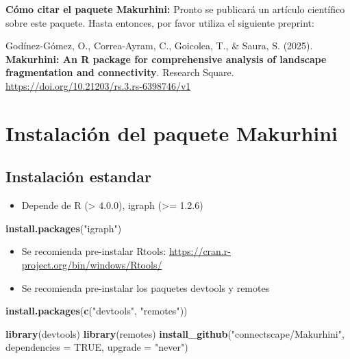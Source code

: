 \documentclass[
]{book}
\newenvironment{Shaded}{\begin{snugshade}}{\end{snugshade}}
\newcommand{\AttributeTok}[1]{\textcolor[rgb]{0.13,0.29,0.53}{#1}}
\newcommand{\ConstantTok}[1]{\textcolor[rgb]{0.56,0.35,0.01}{#1}}
\newcommand{\FunctionTok}[1]{\textcolor[rgb]{0.13,0.29,0.53}{\textbf{#1}}}
\newcommand{\NormalTok}[1]{#1}
\newcommand{\StringTok}[1]{\textcolor[rgb]{0.31,0.60,0.02}{#1}}
\providecommand{\tightlist}{%
  \setlength{\itemsep}{0pt}\setlength{\parskip}{0pt}}
\begin{document}
\textbf{Cómo citar el paquete Makurhini:} Pronto se publicará un artículo científico sobre este paquete. Hasta entonces, por favor utiliza el siguiente preprint:

Godínez-Gómez, O., Correa-Ayram, C., Goicolea, T., \& Saura, S. (2025). \textbf{Makurhini: An R package for comprehensive analysis of landscape fragmentation and connectivity}. Research Square. \url{https://doi.org/10.21203/rs.3.rs-6398746/v1}

\chapter{Instalación del paquete Makurhini}\label{instalaciuxf3n-del-paquete-makurhini}

\section{Instalación estandar}\label{instalaciuxf3n-estandar}

\begin{itemize}
\tightlist
\item
  Depende de R (\textgreater{} 4.0.0), igraph (\textgreater= 1.2.6)
\end{itemize}

\begin{Shaded}
\begin{Highlighting}[]
\FunctionTok{install.packages}\NormalTok{(}\StringTok{"igraph"}\NormalTok{)}
\end{Highlighting}
\end{Shaded}

\begin{itemize}
\item
  Se recomienda pre-instalar Rtools:
  \url{https://cran.r-project.org/bin/windows/Rtools/}
\item
  Se recomienda pre-instalar los paquetes devtools y remotes
\end{itemize}

\begin{Shaded}
\begin{Highlighting}[]
\FunctionTok{install.packages}\NormalTok{(}\FunctionTok{c}\NormalTok{(}\StringTok{"devtools"}\NormalTok{, }\StringTok{"remotes"}\NormalTok{))}
\end{Highlighting}
\end{Shaded}

\begin{Shaded}
\begin{Highlighting}[]
\FunctionTok{library}\NormalTok{(devtools) }
\FunctionTok{library}\NormalTok{(remotes)}
\FunctionTok{install\_github}\NormalTok{(}\StringTok{"connectscape/Makurhini"}\NormalTok{, }\AttributeTok{dependencies =} \ConstantTok{TRUE}\NormalTok{, }\AttributeTok{upgrade =} \StringTok{"never"}\NormalTok{)}
\end{Highlighting}
\end{Shaded}
\end{document}
